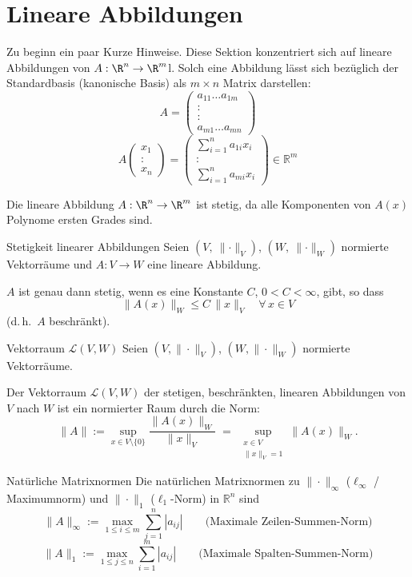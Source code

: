 \newpage
\section{Lineare Abbildungen}
\label{3.2}
Zu beginn ein paar Kurze Hinweise. Diese Sektion konzentriert sich auf lineare Abbildungen von $A : \R^n \to \R^m$l. Solch eine Abbildung lässt sich bezüglich der Standardbasis (kanonische Basis) als $m \times n$ Matrix darstellen: 
$$
    A = \begin{pmatrix} a_{11} \dotso a_{1m} \\ : \\ : \\ a_{m1} \dotso a_{mn} \end{pmatrix}
$$
$$
    A \begin{pmatrix} x_1 \\ : \\ x_n \end{pmatrix} = \begin{pmatrix} \sum_{i=1}^n a_{1i} x_i \\ : \\ \sum_{i=1}^n a_{mi} x_i \end{pmatrix} \in \mathbb{R}^m
$$

Die lineare Abbildung $A : \R^n \to \R^m$ ist stetig, da alle Komponenten von $A(x)$ Polynome ersten Grades sind.

\begin{satz}{Stetigkeit linearer Abbildungen}
    Seien $(V,\ \lVert\cdot\rVert_V)$, $(W,\ \lVert\cdot\rVert_W)$ normierte Vektorräume und $A: V \to W$ eine lineare Abbildung.

    $A$ ist genau dann stetig, wenn es eine Konstante $C$, $0 < C < \infty$, gibt, so dass
    $$
    \lVert A(x)\rVert_W \le C\,\lVert x\rVert_V \quad \forall\, x \in V
    $$
    (d.\,h.\ $A$ beschränkt).    
\end{satz}

\begin{satz}{Vektorraum $\mathcal{L}(V,W)$}
    Seien $(V,\|\cdot\|_V)$, $(W,\|\cdot\|_W)$ normierte Vektorräume.

    Der Vektorraum $\mathcal{L}(V,W)$ der stetigen, beschränkten, linearen Abbildungen von $V$ nach $W$ ist ein normierter Raum durch die Norm:
    $$
    \|A\| := \sup_{x\in V\setminus\{0\}} \frac{\|A(x)\|_W}{\|x\|_V}
        \;=\; \sup_{\substack{x\in V\\ \|x\|_V=1}} \|A(x)\|_W.
    $$
\end{satz}

\begin{lemma}{Natürliche Matrixnormen}
    Die natürlichen Matrixnormen zu $\|\cdot\|_\infty$ ($\ell_\infty$ / Maximumnorm) und $\|\cdot\|_1$ ($\ell_1$-Norm) in $\mathbb{R}^n$ sind
    $$
    \|A\|_\infty := \max_{1\le i\le m}\sum_{j=1}^{n} |a_{ij}|
    \qquad\text{(Maximale Zeilen-Summen-Norm)}
    $$
    $$
    \|A\|_1 := \max_{1\le j\le n}\sum_{i=1}^{m} |a_{ij}|
    \qquad\text{(Maximale Spalten-Summen-Norm)}
    $$  
\end{lemma}

